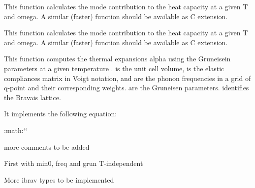 \documentclass[letterpaper,10pt,english]{sphinxmanual}
\begin{document}
\begin{fulllineitems}
\label{pyqha:pyqha.alphagruneisenp.c_qv}
This function calculates the mode contribution to the heat capacity at a given T
and omega. A similar (faster) function should be available as C extension.

\end{fulllineitems}


\begin{fulllineitems}
\label{pyqha:pyqha.alphagruneisenp.c_qv2}
\end{fulllineitems}


\begin{fulllineitems}
\label{pyqha:pyqha.alphagruneisenp.c_qv_python}
This function calculates the mode contribution to the heat capacity at a given T
and omega. A similar (faster) function should be available as C extension.

\end{fulllineitems}


\begin{fulllineitems}
\label{pyqha:pyqha.alphagruneisenp.compute_alpha_grun}
This function computes the thermal expansions alpha using the Gruneisein 
parameters at a given temperature .  is the unit cell volume,  is
the elastic compliances matrix in Voigt notation,  and   are
the phonon frequencies in a grid of q-point and their corresponding weights.
 are the Gruneisen parameters.  identifies the Bravais lattice.

It implements the following equation:

:math:{}`{}`

more comments to be added

First with min0, freq and grun T-independent

More ibrav types to be implemented

\end{fulllineitems}
\end{document}

